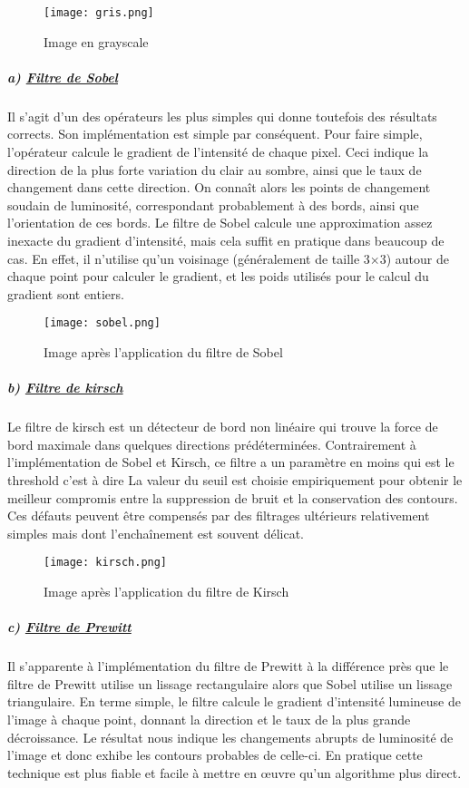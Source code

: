 \documentclass[11pt]{article}
\begin{document}
\begin{figure}[h]
\begin{center}
\texttt{[image: gris.png]}
\caption{ Image en grayscale}
\end{center}
\end{figure}

\subparagraph{a) \underline{Filtre de Sobel}}

Il s'agit d'un des opérateurs les plus simples qui donne toutefois des résultats corrects. Son implémentation est simple par conséquent. Pour faire simple, l'opérateur calcule le gradient de l'intensité de chaque pixel. Ceci indique la direction de la plus forte variation du clair au sombre, ainsi que le taux de changement dans cette direction. On connaît alors les points de changement soudain de luminosité, correspondant probablement à des bords, ainsi que l'orientation de ces bords. Le filtre de Sobel calcule une approximation assez inexacte du gradient d'intensité, mais cela suffit en pratique dans beaucoup de cas. En effet, il n'utilise qu'un voisinage (généralement de taille 3×3) autour de chaque point pour calculer le gradient, et les poids utilisés pour le calcul du gradient sont entiers.

\begin{figure}[h]
\centering
\texttt{[image: sobel.png]}
\caption{ Image après l'application du filtre de Sobel}
\end{figure}

\subparagraph{b) \underline{Filtre de kirsch}}

Le filtre de kirsch est un détecteur de bord non linéaire qui trouve la force de bord maximale dans quelques directions prédéterminées. Contrairement à l'implémentation de Sobel et Kirsch, ce filtre a un paramètre en moins qui est le threshold c'est à dire La valeur du seuil est choisie empiriquement pour obtenir le meilleur compromis entre la suppression de bruit et la conservation des contours. Ces défauts peuvent   être compensés par des filtrages ultérieurs relativement simples mais dont l'enchaînement est souvent délicat.

\begin{figure}[h]
\centering
\texttt{[image: kirsch.png]}
\caption{ Image après l'application du filtre de Kirsch}
\end{figure}
\newpage

\subparagraph{c) \underline{Filtre de Prewitt}}
Il s'apparente à l'implémentation du filtre de Prewitt à la différence près que le filtre de Prewitt utilise un lissage rectangulaire alors que Sobel utilise un lissage triangulaire. En terme simple, le filtre calcule le gradient d'intensité lumineuse de l'image à chaque point, donnant la direction et le taux de la plus grande décroissance. Le résultat nous indique les changements abrupts de luminosité de l'image et donc exhibe les contours probables de celle-ci. En pratique cette technique est plus fiable et facile à mettre en œuvre qu'un algorithme plus direct.
\end{document}

